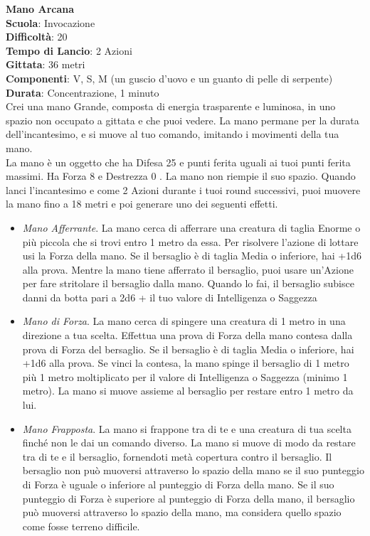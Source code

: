 \begin{multicols}{2}
\medskip\textbf{Mano Arcana}\\
\textbf{Scuola}: Invocazione\\
\textbf{Difficoltà}:  20\\
\textbf{Tempo di Lancio}: 2 Azioni\\
\textbf{Gittata}: 36 metri\\
\textbf{Componenti}: V, S, M (un guscio d’uovo e un guanto di pelle di serpente)\\
\textbf{Durata}: Concentrazione, 1 minuto\\
Crei una mano Grande, composta di energia trasparente e luminosa, in uno spazio non occupato a gittata e che puoi vedere. La mano permane per la durata dell'incantesimo, e si muove al tuo comando, imitando i movimenti della tua mano.\\
La mano è un oggetto che ha Difesa 25 e punti ferita uguali  ai tuoi punti ferita massimi. Ha Forza 8 e Destrezza 0 . La mano non riempie il suo spazio.
Quando lanci l'incantesimo e come 2 Azioni durante i tuoi round successivi, puoi muovere la mano fino a 18 metri e poi generare uno dei seguenti effetti. 
\medskip
\begin{itemize}
\item
\textit{Mano Afferrante}. La mano cerca di afferrare una creatura di taglia Enorme o più piccola che si trovi entro  1 metro da essa. Per risolvere l’azione di lottare usi la Forza della mano. Se il bersaglio è di taglia Media o inferiore, hai +1d6 alla prova. Mentre la mano tiene afferrato il bersaglio, puoi usare un'Azione per fare stritolare il bersaglio dalla mano. Quando lo fai, il bersaglio subisce danni da botta pari a  2d6 + il tuo valore di Intelligenza o Saggezza
\item
\textit{Mano di Forza}. La mano cerca di spingere una creatura di 1 metro in una direzione a tua scelta. Effettua una prova di Forza della mano contesa dalla prova di Forza del bersaglio. Se il bersaglio è di taglia Media o inferiore, hai +1d6 alla prova. Se vinci la contesa, la mano spinge il bersaglio di 1 metro più 1 metro moltiplicato per il valore di Intelligenza o Saggezza (minimo 1 metro). La mano si muove assieme al bersaglio per restare entro 1 metro da lui.\\
\item
\textit{Mano Frapposta}. La mano si frappone tra di te e una creatura di tua scelta finché non le dai un comando  diverso. La mano si muove di modo da restare tra di te e il bersaglio, fornendoti metà copertura contro il  bersaglio. Il bersaglio non può muoversi attraverso lo spazio della mano se il suo punteggio di Forza è uguale o inferiore al punteggio di Forza della mano. Se il suo punteggio di Forza è superiore al punteggio di Forza della mano, il bersaglio può muoversi attraverso lo spazio  della mano, ma considera quello spazio come fosse terreno difficile. \\

\end{itemize}
\end{multicols}
